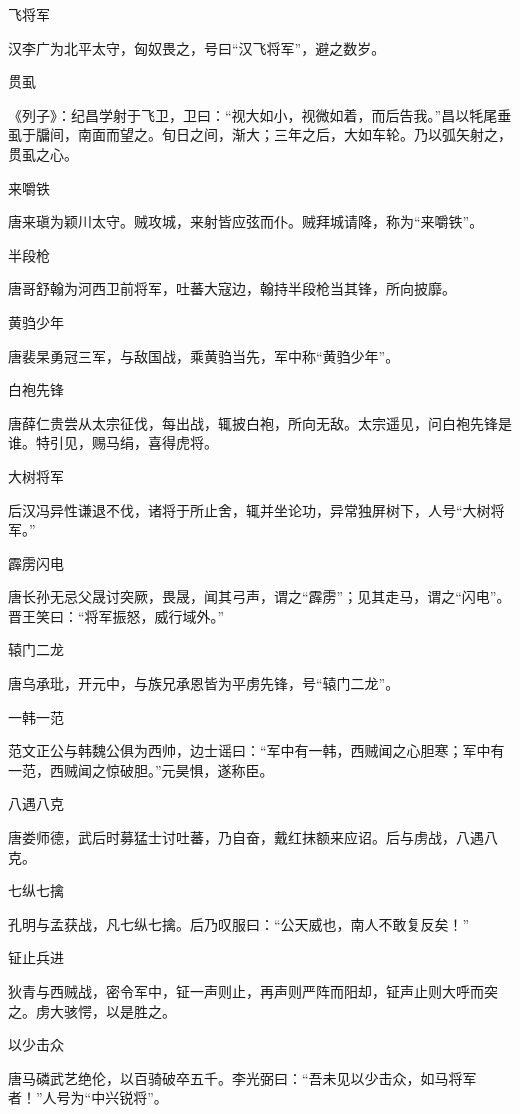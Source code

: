 \documentclass[a4paper,12pt,UTF8,twoside]{ctexbook}
\begin{document}
    飞将军
    
    汉李广为北平太守，匈奴畏之，号曰“汉飞将军”，避之数岁。
    
    贯虱
    
    《列子》：纪昌学射于飞卫，卫曰：“视大如小，视微如着，而后告我。”昌以牦尾垂虱于牖间，南面而望之。旬日之间，渐大；三年之后，大如车轮。乃以弧矢射之，贯虱之心。
    
    来嚼铁
    
    唐来瑱为颖川太守。贼攻城，来射皆应弦而仆。贼拜城请降，称为“来嚼铁”。
    
    半段枪
    
    唐哥舒翰为河西卫前将军，吐蕃大寇边，翰持半段枪当其锋，所向披靡。
    
    黄驺少年
    
    唐裴杲勇冠三军，与敌国战，乘黄驺当先，军中称“黄驺少年”。
    
    白袍先锋
    
    唐薛仁贵尝从太宗征伐，每出战，辄披白袍，所向无敌。太宗遥见，问白袍先锋是谁。特引见，赐马绢，喜得虎将。
    
    大树将军
    
    后汉冯异性谦退不伐，诸将于所止舍，辄并坐论功，异常独屏树下，人号“大树将军。”
    
    霹雳闪电
    
    唐长孙无忌父晟讨突厥，畏晟，闻其弓声，谓之“霹雳”；见其走马，谓之“闪电”。晋王笑曰：“将军振怒，威行域外。”
    
    辕门二龙
    
    唐乌承玭，开元中，与族兄承恩皆为平虏先锋，号“辕门二龙”。
    
    一韩一范
    
    范文正公与韩魏公俱为西帅，边士谣曰：“军中有一韩，西贼闻之心胆寒；军中有一范，西贼闻之惊破胆。”元昊惧，遂称臣。
    
    八遇八克
    
    唐娄师德，武后时募猛士讨吐蕃，乃自奋，戴红抹额来应诏。后与虏战，八遇八克。
    
    七纵七擒
    
    孔明与孟获战，凡七纵七擒。后乃叹服曰：“公天威也，南人不敢复反矣！”
    
    钲止兵进
    
    狄青与西贼战，密令军中，钲一声则止，再声则严阵而阳却，钲声止则大呼而突之。虏大骇愕，以是胜之。
    
    以少击众
    
    唐马磷武艺绝伦，以百骑破卒五千。李光弼曰：“吾未见以少击众，如马将军者！”人号为“中兴锐将”。
    
\end{document}
